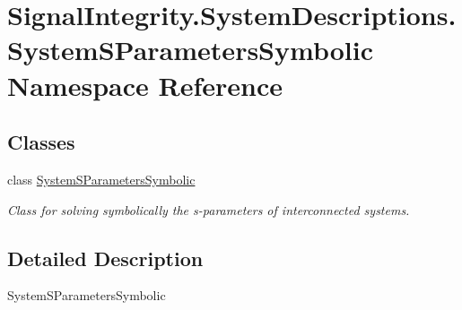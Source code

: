 \hypertarget{namespaceSignalIntegrity_1_1SystemDescriptions_1_1SystemSParametersSymbolic}{}\section{Signal\+Integrity.\+System\+Descriptions.\+System\+S\+Parameters\+Symbolic Namespace Reference}
\label{namespaceSignalIntegrity_1_1SystemDescriptions_1_1SystemSParametersSymbolic}
\subsection*{Classes}
\begin{DoxyCompactItemize}
\item 
class \hyperlink{classSignalIntegrity_1_1SystemDescriptions_1_1SystemSParametersSymbolic_1_1SystemSParametersSymbolic}{System\+S\+Parameters\+Symbolic}
\begin{DoxyCompactList}\small\item\em Class for solving symbolically the s-\/parameters of interconnected systems. \end{DoxyCompactList}\end{DoxyCompactItemize}


\subsection{Detailed Description}
\begin{DoxyVerb}SystemSParametersSymbolic\end{DoxyVerb}
 
